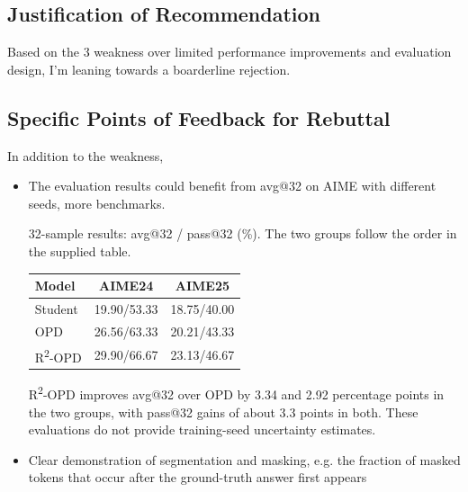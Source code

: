 \subsection*{Justification of Recommendation}
Based on the 3 weakness over limited performance improvements and evaluation design, I'm leaning towards a boarderline rejection.

\subsection*{Specific Points of Feedback for Rebuttal}
In addition to the weakness,

\begin{itemize}
\item The evaluation results could benefit from avg@32 on AIME with different seeds, more benchmarks.
\par{}
\begin{responsebox}[frametitle={Response to Q1}]
32-sample results: avg@32 / pass@32 (\%).
The two groups follow the order in the supplied table.

\begin{center}
\begin{tabular}{lcc}
\hline
Model & AIME24 & AIME25 \\
\hline
Student & 19.90/53.33 & 18.75/40.00 \\
OPD & 26.56/63.33 & 20.21/43.33 \\
R\textsuperscript{2}-OPD & 29.90/66.67 & 23.13/46.67 \\
\hline
\end{tabular}
\end{center}

R\textsuperscript{2}-OPD improves avg@32 over OPD by 3.34 and 2.92
percentage points in the two groups, with pass@32 gains of about 3.3 points
in both. These evaluations do not provide training-seed uncertainty estimates.
\end{responsebox}

\item Clear demonstration of segmentation and masking, e.g. the fraction of masked tokens that occur after the ground-truth answer first appears
\par{}
\begin{responsebox}[frametitle={Response to Q2}]
\vspace*{2\baselineskip}
\end{responsebox}


\end{itemize}
